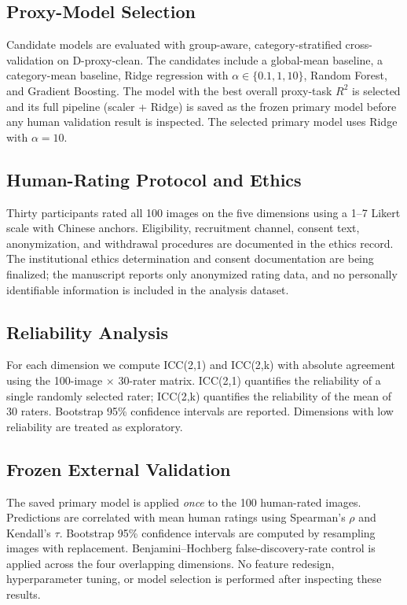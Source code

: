 \subsection{Proxy-Model Selection}
\label{sec:model_selection}

Candidate models are evaluated with group-aware, category-stratified cross-validation on D-proxy-clean. The candidates include a global-mean baseline, a category-mean baseline, Ridge regression with $\alpha \in \{0.1, 1, 10\}$, Random Forest, and Gradient Boosting. The model with the best overall proxy-task $R^2$ is selected and its full pipeline (scaler + Ridge) is saved as the frozen primary model before any human validation result is inspected. The selected primary model uses Ridge with $\alpha = 10$.

\subsection{Human-Rating Protocol and Ethics}
\label{sec:human_protocol}

Thirty participants rated all 100 images on the five dimensions using a 1--7 Likert scale with Chinese anchors. Eligibility, recruitment channel, consent text, anonymization, and withdrawal procedures are documented in the ethics record. The institutional ethics determination and consent documentation are being finalized; the manuscript reports only anonymized rating data, and no personally identifiable information is included in the analysis dataset.

\subsection{Reliability Analysis}
\label{sec:reliability}

For each dimension we compute ICC(2,1) and ICC(2,k) with absolute agreement using the 100-image $\times$ 30-rater matrix. ICC(2,1) quantifies the reliability of a single randomly selected rater; ICC(2,k) quantifies the reliability of the mean of 30 raters. Bootstrap 95\% confidence intervals are reported. Dimensions with low reliability are treated as exploratory.

\subsection{Frozen External Validation}
\label{sec:frozen_validation}

The saved primary model is applied \emph{once} to the 100 human-rated images. Predictions are correlated with mean human ratings using Spearman's $\rho$ and Kendall's $\tau$. Bootstrap 95\% confidence intervals are computed by resampling images with replacement. Benjamini--Hochberg false-discovery-rate control is applied across the four overlapping dimensions. No feature redesign, hyperparameter tuning, or model selection is performed after inspecting these results.

